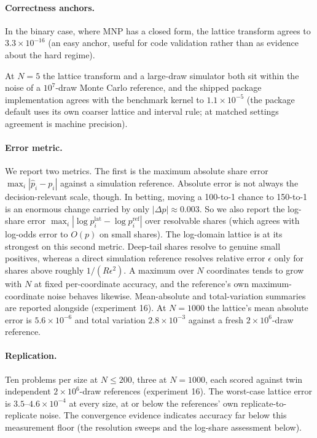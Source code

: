 \documentclass[12pt]{article}
\theoremstyle{remark}
\begin{document}
\paragraph{Correctness anchors.} In the binary case, where MNP has a
closed form, the lattice transform agrees to $3.3\times10^{-16}$ (an easy
anchor, useful for code validation rather than as evidence about the hard
regime).

At $N=5$ the lattice transform and a large-draw simulator both sit
within the noise of a $10^7$-draw Monte Carlo reference, and the shipped
package implementation agrees with the benchmark kernel to
$1.1\times10^{-5}$ (the package default uses its own coarser lattice
and interval rule; at matched settings agreement is machine precision).

\paragraph{Error metric.} We report two metrics. The first is the
maximum absolute share error $\max_i |\hat p_i - p_i|$ against a
simulation reference. Absolute error is not always the decision-relevant
scale, though. In betting, moving a 100-to-1 chance to 150-to-1 is an
enormous change carried by only $|\Delta p| \approx 0.003$. So we also
report the log-share error $\max_i |\log p^{\mathrm{lat}}_i -
\log p_i^{\mathrm{ref}}|$ over resolvable shares (which agrees with
log-odds error to $O(p)$ on small shares). The log-domain lattice is at
its strongest on this second metric. Deep-tail shares resolve to genuine
small positives, whereas a direct simulation reference resolves relative
error $\epsilon$ only for shares above roughly $1/(R\epsilon^2)$. A maximum over $N$ coordinates tends to grow with $N$ at fixed
per-coordinate accuracy, and the reference's own maximum-coordinate noise
behaves likewise. Mean-absolute and total-variation summaries are
reported alongside (experiment 16). At $N=1000$ the lattice's mean
absolute error is
$5.6\times10^{-6}$ and total variation $2.8\times10^{-3}$ against a fresh
$2\times10^6$-draw reference.

\paragraph{Replication.} Ten problems per size at $N \le 200$, three at
$N=1000$, each scored against twin independent $2\times10^6$-draw
references (experiment 16). The worst-case lattice error is
$3.5$--$4.6\times10^{-4}$ at every size, at or below the references' own
replicate-to-replicate noise. The convergence evidence indicates accuracy far
below this measurement floor (the resolution sweeps and the log-share
assessment below).
\end{document}
